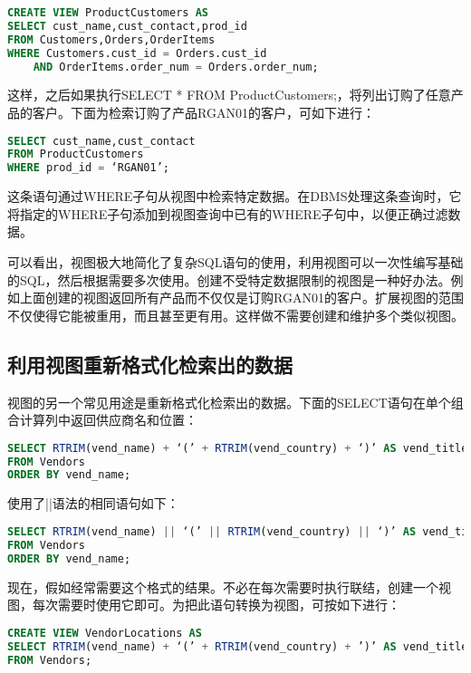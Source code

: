 \begin{lstlisting}[language=SQL]
CREATE VIEW ProductCustomers AS
SELECT cust_name,cust_contact,prod_id
FROM Customers,Orders,OrderItems
WHERE Customers.cust_id = Orders.cust_id
	AND OrderItems.order_num = Orders.order_num;
\end{lstlisting}

这样，之后如果执行SELECT * FROM ProductCustomers;，将列出订购了任意产品的客户。下面为检索订购了产品RGAN01的客户，可如下进行：

\begin{lstlisting}[language=SQL]
SELECT cust_name,cust_contact
FROM ProductCustomers
WHERE prod_id = ‘RGAN01’;
\end{lstlisting}

这条语句通过WHERE子句从视图中检索特定数据。在DBMS处理这条查询时，它将指定的WHERE子句添加到视图查询中已有的WHERE子句中，以便正确过滤数据。

可以看出，视图极大地简化了复杂SQL语句的使用，利用视图可以一次性编写基础的SQL，然后根据需要多次使用。创建不受特定数据限制的视图是一种好办法。例如上面创建的视图返回所有产品而不仅仅是订购RGAN01的客户。扩展视图的范围不仅使得它能被重用，而且甚至更有用。这样做不需要创建和维护多个类似视图。


\subsection{利用视图重新格式化检索出的数据}



视图的另一个常见用途是重新格式化检索出的数据。下面的SELECT语句在单个组合计算列中返回供应商名和位置：

\begin{lstlisting}[language=SQL]
SELECT RTRIM(vend_name) + ‘(’ + RTRIM(vend_country) + ‘)’ AS vend_title
FROM Vendors
ORDER BY vend_name;
\end{lstlisting}

使用了||语法的相同语句如下：

\begin{lstlisting}[language=SQL]
SELECT RTRIM(vend_name) || ‘(’ || RTRIM(vend_country) || ‘)’ AS vend_title
FROM Vendors
ORDER BY vend_name;
\end{lstlisting}

现在，假如经常需要这个格式的结果。不必在每次需要时执行联结，创建一个视图，每次需要时使用它即可。为把此语句转换为视图，可按如下进行：
\begin{lstlisting}[language=SQL]
CREATE VIEW VendorLocations AS
SELECT RTRIM(vend_name) + ‘(’ + RTRIM(vend_country) + ’)’ AS vend_title
FROM Vendors;
\end{lstlisting}

